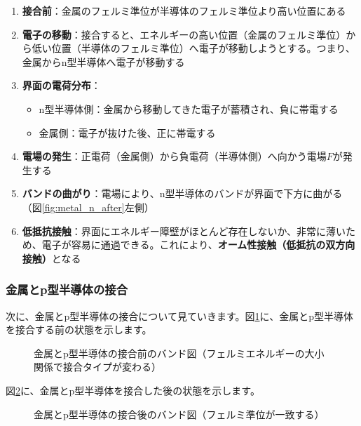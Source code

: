 \begin{enumerate}
\item \textbf{接合前}：金属のフェルミ準位が半導体のフェルミ準位より高い位置にある

\item \textbf{電子の移動}：接合すると、エネルギーの高い位置（金属のフェルミ準位）から低い位置（半導体のフェルミ準位）へ電子が移動しようとする。つまり、金属からn型半導体へ電子が移動する

\item \textbf{界面の電荷分布}：
\begin{itemize}
\item n型半導体側：金属から移動してきた電子が蓄積され、負に帯電する
\item 金属側：電子が抜けた後、正に帯電する
\end{itemize}

\item \textbf{電場の発生}：正電荷（金属側）から負電荷（半導体側）へ向かう電場$F$が発生する

\item \textbf{バンドの曲がり}：電場により、n型半導体のバンドが界面で下方に曲がる（図\ref{fig:metal_n_after}左側）

\item \textbf{低抵抗接触}：界面にエネルギー障壁がほとんど存在しないか、非常に薄いため、電子が容易に通過できる。これにより、\textbf{オーム性接触（低抵抗の双方向接触）}となる
\end{enumerate}

\subsubsection{金属とp型半導体の接合}

次に、金属とp型半導体の接合について見ていきます。図\ref{fig:metal_p_before}に、金属とp型半導体を接合する前の状態を示します。

\begin{figure}[H]
\centering
{}
\caption{金属とp型半導体の接合前のバンド図（フェルミエネルギーの大小関係で接合タイプが変わる）}
\label{fig:metal_p_before}
\end{figure}

図\ref{fig:metal_p_after}に、金属とp型半導体を接合した後の状態を示します。

\begin{figure}[H]
\centering
{}
\caption{金属とp型半導体の接合後のバンド図（フェルミ準位が一致する）}
\label{fig:metal_p_after}
\end{figure}

